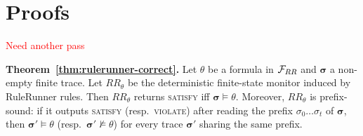 \section{Proofs}

\textcolor{red}{Need another pass}

\noindent
\textbf{Theorem~\ref{thm:rulerunner-correct}.}
Let $\theta$ be a formula in ${\mathcal{F}}_{RR}$ and $\boldsymbol{\sigma}$ a non-empty
finite trace. Let $RR_\theta$ be the deterministic finite-state monitor induced
by RuleRunner rules. Then $RR_\theta$ returns \textsc{satisfy} iff
$\boldsymbol{\sigma}\models\theta$. Moreover, $RR_\theta$ is prefix-sound: if it
outputs \textsc{satisfy} (resp.\ \textsc{violate}) after reading the prefix
$\sigma_0\dots\sigma_t$ of $\boldsymbol{\sigma}$, then
$\boldsymbol{\sigma}'\models\theta$ (resp.\ $\boldsymbol{\sigma}'\not\models\theta$)
for every trace $\boldsymbol{\sigma}'$ sharing the same prefix.

